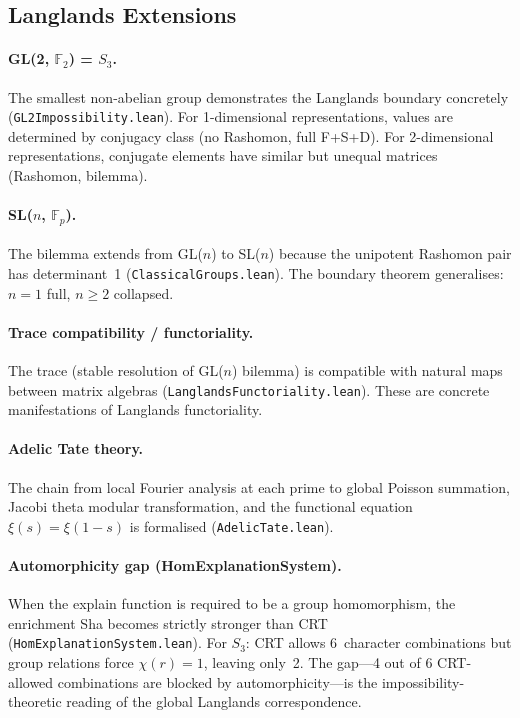 \documentclass[11pt,a4paper]{article}
\begin{document}
\subsection{Langlands Extensions}

\paragraph{GL(2, $\mathbb{F}_2$) = $S_3$.}
The smallest non-abelian group demonstrates the Langlands boundary concretely (\texttt{GL2Impossibility.lean}).  For 1-dimensional representations, values are determined by conjugacy class (no Rashomon, full F+S+D).  For 2-dimensional representations, conjugate elements have similar but unequal matrices (Rashomon, bilemma).

\paragraph{SL($n$, $\mathbb{F}_p$).}
The bilemma extends from GL($n$) to SL($n$) because the unipotent Rashomon pair has determinant~1 (\texttt{ClassicalGroups.lean}).  The boundary theorem generalises: $n = 1$ full, $n \geq 2$ collapsed.

\paragraph{Trace compatibility / functoriality.}
The trace (stable resolution of GL($n$) bilemma) is compatible with natural maps between matrix algebras (\texttt{LanglandsFunctoriality.lean}).  These are concrete manifestations of Langlands functoriality.

\paragraph{Adelic Tate theory.}
The chain from local Fourier analysis at each prime to global Poisson summation, Jacobi theta modular transformation, and the functional equation $\xi(s) = \xi(1-s)$ is formalised (\texttt{AdelicTate.lean}).

\paragraph{Automorphicity gap (HomExplanationSystem).}
When the explain function is required to be a group homomorphism, the enrichment Sha becomes strictly stronger than CRT (\texttt{HomExplanationSystem.lean}).  For $S_3$: CRT allows 6~character combinations but group relations force $\chi(r) = 1$, leaving only~2.  The gap---4 out of 6 CRT-allowed combinations are blocked by automorphicity---is the impossibility-theoretic reading of the global Langlands correspondence.
\end{document}
